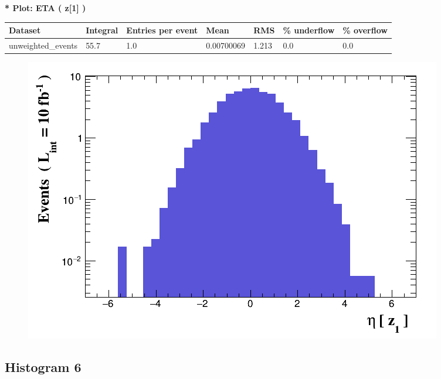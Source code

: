 \documentclass[a4paper, 10pt]{article}
\begin{document}
\textbf{* Plot: ETA ( z[1] ) }\\
   \begin{table}[H]
  \begin{center}
    \begin{tabular}{|m{23.0mm}|m{23.0mm}|m{18.0mm}|m{19.0mm}|m{19.0mm}|m{19.0mm}|m{19.0mm}|}
      \hline
      {\cellcolor{yellow}         Dataset}& {\cellcolor{yellow}         Integral}& {\cellcolor{yellow}         Entries per event}& {\cellcolor{yellow}         Mean}& {\cellcolor{yellow}         RMS}& {\cellcolor{yellow}         \% underflow}& {\cellcolor{yellow}         \% overflow}\\
      \hline
      {\cellcolor{white}         unweighted\_events}& {\cellcolor{white}         55.7}& {\cellcolor{white}         1.0}& {\cellcolor{white}         0.00700069}& {\cellcolor{white}         1.213}& {\cellcolor{green}         0.0}& {\cellcolor{green}         0.0}\\
\hline
    \end{tabular}
  \end{center}
\end{table}

\begin{figure}[H]
  \begin{center}
    \includegraphics[scale=0.45]{selection_4.png}\\
\caption{   }
  \end{center}
\end{figure}
      \newpage
\subsection{ Histogram 6}
\end{document}
